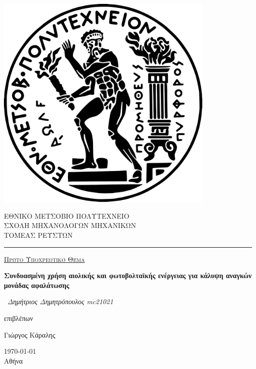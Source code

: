 \begin{titlepage}
	\begin{center}
		\begin{minipage}{0.15\textwidth}%
			\includegraphics[width=0.8\textwidth]{./logo/pyro.pdf}
		\end{minipage}\hspace{10pt}
		\begin{minipage}{0.6\textwidth}%
			ΕΘΝΙΚΟ ΜΕΤΣΟΒΙΟ ΠΟΛΥΤΕΧΝΕΙΟ\\
			ΣΧΟΛΗ ΜΗΧΑΝΟΛΟΓΩΝ ΜΗΧΑΝΙΚΩΝ\\
			ΤΟΜΕΑΣ ΡΕΥΣΤΩΝ\\
		\end{minipage}%
	\end{center}

	\par\noindent\rule{\textwidth}{0.8pt}

	\vspace{1cm}
	{\centering

		{\scshape\Large \underline{Πρώτο Υποχρεωτικό Θέμα}\par}
		\vspace{1.5cm}
		{\huge\bfseries Συνδυασμένη χρήση αιολικής και φωτοβολταϊκής ενέργειας για κάλυψη αναγκών μονάδας αφαλάτωσης\par}
		\vspace{2cm}
		{\Large\itshape~Δημήτριος Δημητρόπουλος mc21021\/\par}

		\vfill
		επιβλέπων\par
		Γιώργος Κάραλης

		\vfill

		\begin{center}
			{\large \today\\ Αθήνα}
		\end{center}
	}
\end{titlepage}

